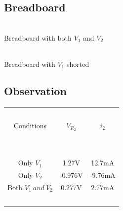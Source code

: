 \documentclass{article}
\begin{document}
\subsection{Breadboard}
\begin{multicols}{2}
\begin{center}
 \\ \vspace{5px}
Breadboard with both $V_1$ and $V_2$ \\

\columnbreak

 \\ \vspace{5px}
Breadboard with $V_1$ shorted
\end{center}
\end{multicols}
\subsection{Observation}
\begin{center}
\begin{tabular}{| c | c | c |} 
 \hline
    \ & \ & \ \\
    Conditions & $V_{R_2}$ & $i_2$ \\
    \ & \ & \ \\
    \hline
    \ & \ & \ \\
    Only $V_1$ & 1.27V & 12.7mA \\
    Only $V_2$ & -0.976V & -9.76mA \\
    Both $V_1 \ and \ V_2$ & 0.277V & 2.77mA \\
    \ & \ & \ \\
    \hline
\end{tabular}
\end{center}
\end{document}
